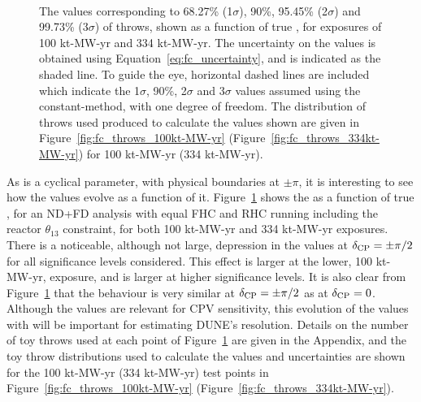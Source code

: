 \begin{figure}[htbp]
  \centering
  \\
  \caption{The \dchisqcrit values corresponding to 68.27\% (1$\sigma$), 90\%, 95.45\% (2$\sigma$) and 99.73\% (3$\sigma$) of throws, shown as a function of true \deltacp, for exposures of 100 kt-MW-yr and 334 kt-MW-yr. The uncertainty on the \dchisqcrit values is obtained using Equation~\ref{eq:fc_uncertainty}, and is indicated as the shaded line. To guide the eye, horizontal dashed lines are included which indicate the 1$\sigma$, 90\%, 2$\sigma$ and 3$\sigma$ \dchisq values assumed using the constant-\dchisq method, with one degree of freedom. The distribution of throws used produced to calculate the \dchisqcrit values shown are given in Figure~\ref{fig:fc_throws_100kt-MW-yr} (Figure~\ref{fig:fc_throws_334kt-MW-yr}) for 100 kt-MW-yr (334 kt-MW-yr).}
  \label{fig:fc_vs_dcp}
\end{figure}
As \deltacp is a cyclical parameter, with physical boundaries at $\pm\pi$, it is interesting to see how the \dchisqcrit values evolve as a function of it. Figure~\ref{fig:fc_vs_dcp} shows the \dchisqcrit as a function of true \deltacp, for an ND+FD analysis with equal FHC and RHC running including the reactor $\theta_{13}$ constraint, for both 100 kt-MW-yr and 334 kt-MW-yr exposures. There is a noticeable, although not large, depression in the \dchisqcrit values at $\delta_{\rm CP} = \pm\pi/2$ for all significance levels considered. This effect is larger at the lower, 100 kt-MW-yr, exposure, and is larger at higher significance levels. It is also clear from Figure~\ref{fig:fc_vs_dcp} that the \dchisqcrit behaviour is very similar at $\delta_{\rm CP} = \pm\pi/2$ as at $\delta_{\rm CP} = 0$. Although the \dchisqcrit values are relevant for CPV sensitivity, this evolution of the \dchisqcrit values with \deltacp will be important for estimating DUNE's \deltacp resolution. Details on the number of toy throws used at each point of Figure~\ref{fig:fc_vs_dcp} are given in the Appendix, and the toy throw distributions used to calculate the \dchisqcrit values and uncertainties are shown for the 100 kt-MW-yr (334 kt-MW-yr) test points in Figure~\ref{fig:fc_throws_100kt-MW-yr} (Figure~\ref{fig:fc_throws_334kt-MW-yr}).


